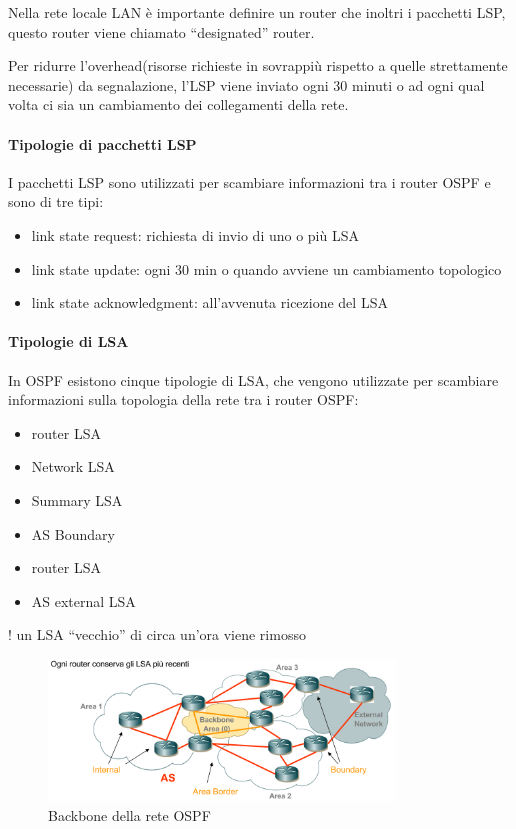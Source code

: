 Nella rete locale LAN è importante definire un router che inoltri i pacchetti LSP, questo router viene chiamato “designated” router.

Per ridurre l'overhead(risorse richieste in sovrappiù rispetto a quelle strettamente necessarie) da segnalazione, l'LSP viene inviato ogni 30 minuti o ad ogni qual volta ci sia un cambiamento dei collegamenti della rete.

\paragraph{Tipologie di pacchetti LSP}
I pacchetti LSP sono utilizzati per scambiare informazioni tra i router OSPF e sono di tre tipi:
\begin{itemize}
    \item link state request: richiesta di invio di uno o più LSA
    \item link state update: ogni 30 min o quando avviene un cambiamento topologico
    \item link state acknowledgment: all'avvenuta ricezione del LSA
\end{itemize}
\paragraph{Tipologie di LSA}
In OSPF esistono cinque tipologie di LSA, che vengono utilizzate per scambiare informazioni sulla topologia della rete tra i router OSPF:
\begin{multicols}{2}
\begin{itemize}
    \item router LSA
    \item Network LSA
    \item Summary LSA
    \item AS Boundary
    \item router LSA
    \item AS external LSA
\end{itemize}
\end{multicols}
! un LSA “vecchio” di circa un'ora viene rimosso
\begin{figure}[h!]
    \centering
    \includegraphics[width=0.82\textwidth]{images/backbone.png}
    \caption{Backbone della rete OSPF}
    \label{fig:backbone}
\end{figure}

